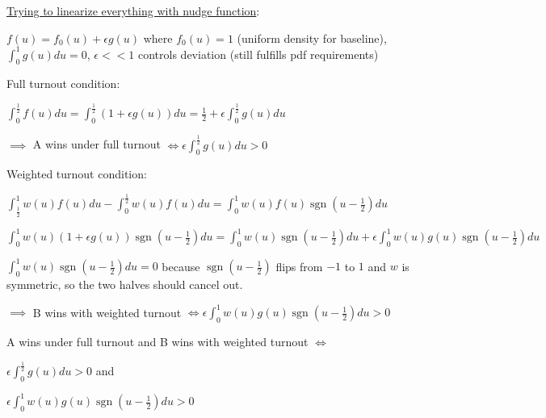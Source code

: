 \documentclass[12pt]{article}
\begin{document}
\underline{Trying to linearize everything with nudge function}:

$f(u) = f_0(u) + \epsilon g(u)$ where $f_0(u) = 1$ (uniform density for baseline), $\int_0^1 g(u) du = 0$, $\epsilon < < 1$ controls deviation (still fulfills pdf requirements)

Full turnout condition:

$\int_0^\frac{1}{2} f(u)du = \int_0^\frac{1}{2} (1 + \epsilon g(u)) du = \frac{1}{2} + \epsilon \int_0^\frac{1}{2}g(u)du$

$\implies$ A wins under full turnout $\iff \epsilon \int_0^\frac{1}{2}g(u)du > 0$

Weighted turnout condition:

$\int_\frac{1}{2}^1w(u)f(u)du - \int_0^\frac{1}{2}w(u)f(u)du = \int_0^1w(u)f(u)\operatorname{sgn}(u - \frac{1}{2})du$

$\int_0^1w(u)(1 + \epsilon g(u))\operatorname{sgn}(u - \frac{1}{2})du = \int_0^1w(u)\operatorname{sgn}(u - \frac{1}{2})du + \epsilon \int_0^1w(u)g(u)\operatorname{sgn}(u - \frac{1}{2})du$

$\int_0^1w(u)\operatorname{sgn}(u - \frac{1}{2})du = 0$ because $\operatorname{sgn}(u - \frac{1}{2})$ flips from $-1$ to $1$ and $w$ is symmetric, so the two halves should cancel out.

$\implies$ B wins with weighted turnout $\iff \epsilon\int_0^1w(u)g(u)\operatorname{sgn}(u - \frac{1}{2})du > 0$

A wins under full turnout and B wins with weighted turnout $\iff$
\begin{description}[nolistsep]
    \item[\normalfont Constraint 1:] $\epsilon \int_0^\frac{1}{2}g(u)du > 0$ and
    \item[\normalfont Constraint 2:] $\epsilon\int_0^1w(u)g(u)\operatorname{sgn}(u - \frac{1}{2})du > 0$
\end{description}
\end{document}
